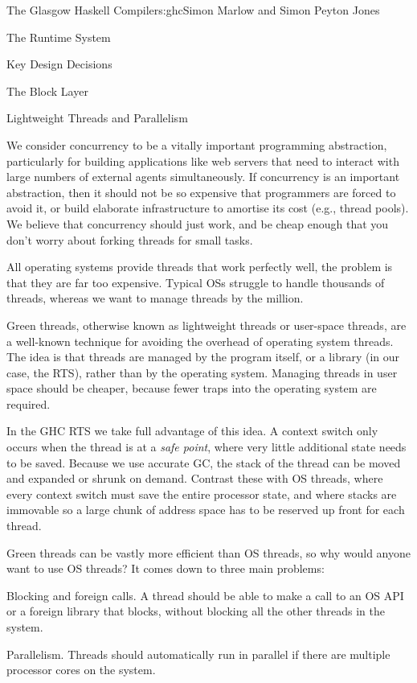 \begin{aosachapter}{The Glasgow Haskell Compiler}{s:ghc}{Simon Marlow and Simon Peyton Jones}
\begin{aosasect1}{The Runtime System}
\begin{aosasect2}{Key Design Decisions}
\begin{aosasect3}{The Block Layer}
\end{aosasect3}

\begin{aosasect3}{Lightweight Threads and Parallelism}

We consider concurrency to be a vitally important programming
abstraction, particularly for building applications like web servers
that need to interact with large numbers of external agents
simultaneously.  If concurrency is an important abstraction, then it
should not be so expensive that programmers are forced to avoid it, or
build elaborate infrastructure to amortise its cost (e.g., thread
pools).  We believe that concurrency should just work, and be cheap
enough that you don't worry about forking threads for small tasks.

All operating systems provide threads that work perfectly well, the
problem is that they are far too expensive.  Typical OSs struggle to
handle thousands of threads, whereas we want to manage threads by the
million.

Green threads, otherwise known as lightweight threads or user-space
threads, are a well-known technique for avoiding the overhead of
operating system threads.  The idea is that threads are managed by the
program itself, or a library (in our case, the RTS), rather than by
the operating system.  Managing threads in user space should be
cheaper, because fewer traps into the operating system are required.

In the GHC RTS we take full advantage of this idea.  A context switch
only occurs when the thread is at a \emph{safe point}, where very
little additional state needs to be saved.  Because we use accurate
GC, the stack of the thread can be moved and expanded or shrunk on
demand.  Contrast these with OS threads, where every context switch
must save the entire processor state, and where stacks are immovable
so a large chunk of address space has to be reserved up front for each
thread.

Green threads can be vastly more efficient than OS threads, so why
would anyone want to use OS threads?  It comes down to three main
problems:

\begin{aosaitemize}

\item Blocking and foreign calls.  A thread should be able to make a
  call to an OS API or a foreign library that blocks, without blocking
  all the other threads in the system.

\item Parallelism.  Threads should automatically run in parallel if
  there are multiple processor cores on the system.


\end{aosaitemize}
\end{aosasect3}
\end{aosasect2}
\end{aosasect1}
\end{aosachapter}

